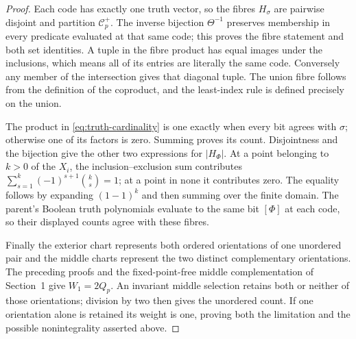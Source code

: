 \begin{proof}
Each code has exactly one truth vector, so the fibres \(H_\sigma\)
are pairwise disjoint and partition \(\mathcal C_p^+\).
The inverse bijection \(\Theta^{-1}\) preserves membership
in every predicate evaluated at that same code; this proves
the fibre statement and both set identities.
A tuple in the fibre product has equal images under the
inclusions, which means all of its entries are literally
the same code.  Conversely any member of the intersection
gives that diagonal tuple.  The union fibre follows from
the definition of the coproduct, and the least-index rule
is defined precisely on the union.

The product in \eqref{eq:truth-cardinality} is one exactly
when every bit agrees with \(\sigma\); otherwise one of
its factors is zero.  Summing proves its count.  Disjointness
and the bijection give the other two expressions for
\(|H_\Phi|\).  At a point belonging to \(k>0\) of the
\(X_i\), the inclusion--exclusion sum contributes
\(\sum_{s=1}^k(-1)^{s+1}\binom{k}{s}=1\);
at a point in none it contributes zero.  The equality follows
by expanding \((1-1)^k\) and then summing over the finite domain.
The parent's Boolean truth polynomials evaluate to the same bit
\([\Phi]\) at each code, so their displayed counts agree with
these fibres.

Finally the exterior chart represents both ordered orientations
of one unordered pair and the middle charts represent the two
distinct complementary orientations.  The preceding proofs and
the fixed-point-free middle complementation of Section~1 give
\(W_1=2Q_p\).  An invariant middle selection retains both or
neither of those orientations; division by two then gives the
unordered count.  If one orientation alone is retained its
weight is one, proving both the limitation and the possible
nonintegrality asserted above.
\end{proof}


